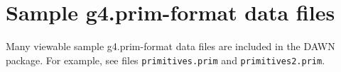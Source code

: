 \section{Sample g4.prim-format data files}   
Many viewable sample g4.prim-format data files
are included in the DAWN package.  
For example, see files \verb+primitives.prim+ 
and \verb+primitives2.prim+.



%
%
%



